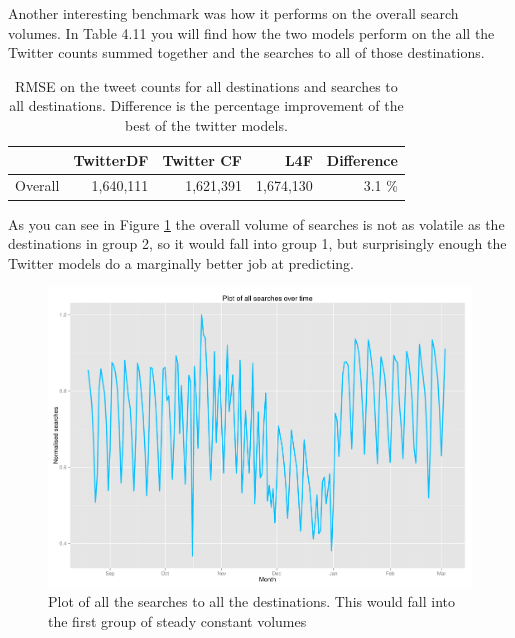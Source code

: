 \documentclass[minf,frontabs,twoside,singlespacing,parskip]{infthesis}
\begin{document}
Another interesting benchmark was how it performs on the overall search volumes. In Table 4.11 you will find how the two models perform on the all the Twitter counts summed together and the searches to all of those destinations.

\begin{table}[h!]
\begin{center}
\begin{tabular}{ l | r | r | r | r}
 & TwitterDF & Twitter CF & L4F & Difference \\
\hline
Overall & 1,640,111 & 1,621,391  & 1,674,130 & 3.1 \% \\
\end{tabular}
\end{center}
\caption{RMSE on the tweet counts for all destinations and searches to all destinations. Difference is the percentage improvement of the best of the twitter models.}
\end{table}

As you can see in Figure \ref{overall-searches} the overall volume of searches is not as volatile as the destinations in group 2, so it would fall into group 1, but surprisingly enough the Twitter models do a marginally better job at predicting.

\begin{figure}[h]
\begin{center}
\includegraphics[scale=0.5]{overall}
\end{center}
\caption{Plot of all the searches to all the destinations. This would fall into the first group of steady constant volumes}
\label{overall-searches}
\end{figure}
\end{document}
